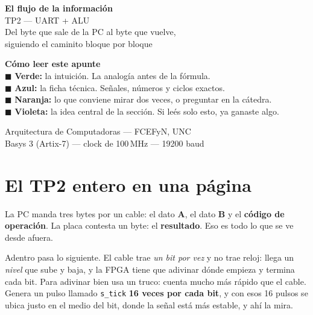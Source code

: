 \documentclass[11pt,a4paper]{article}
\newcommand{\sg}[1]{\texttt{\small #1}}
\begin{document}
\begin{titlepage}
\centering
\vspace*{2.5cm}
{\sffamily\Huge\bfseries\color{azul} El flujo de la informaci\'on}\\[0.4cm]
{\sffamily\LARGE\color{gris} TP2 --- UART + ALU}\\[1.2cm]
{\large Del byte que sale de la PC al byte que vuelve,\\
siguiendo el caminito bloque por bloque}\\[2cm]

\begin{tcolorbox}[width=0.82\textwidth, colback=white, colframe=gris,
                  boxrule=0.7pt, arc=3pt]
\sffamily\small
\textbf{\color{azul} C\'omo leer este apunte}\\[4pt]
\textcolor{verde}{$\blacksquare$} \textbf{Verde:} la intuici\'on. La analog\'ia antes de la f\'ormula.\\[2pt]
\textcolor{azul}{$\blacksquare$} \textbf{Azul:} la ficha t\'ecnica. Se\~nales, n\'umeros y ciclos exactos.\\[2pt]
\textcolor{naranja}{$\blacksquare$} \textbf{Naranja:} lo que conviene mirar dos veces, o preguntar en la c\'atedra.\\[2pt]
\textcolor{violeta}{$\blacksquare$} \textbf{Violeta:} la idea central de la secci\'on. Si le\'es solo esto, ya ganaste algo.
\end{tcolorbox}

\vfill
{\sffamily\small\color{gris} Arquitectura de Computadoras --- FCEFyN, UNC \\
Basys 3 (Artix-7) --- clock de 100\,MHz --- 19200 baud}
\end{titlepage}

\section*{El TP2 entero en una p\'agina}

La PC manda tres bytes por un cable: el dato \textbf{A}, el dato \textbf{B} y el
\textbf{c\'odigo de operaci\'on}. La placa contesta un byte: el \textbf{resultado}.
Eso es todo lo que se ve desde afuera.

Adentro pasa lo siguiente. El cable trae \emph{un bit por vez} y no trae reloj:
llega un \emph{nivel} que sube y baja, y la FPGA tiene que adivinar d\'onde
empieza y termina cada bit. Para adivinar bien usa un truco: cuenta mucho m\'as
r\'apido que el cable. Genera un pulso llamado \sg{s\_tick} \textbf{16 veces por
cada bit}, y con esos 16 pulsos se ubica justo en el medio del bit, donde la
se\~nal est\'a m\'as estable, y ah\'i la mira.
\end{document}
